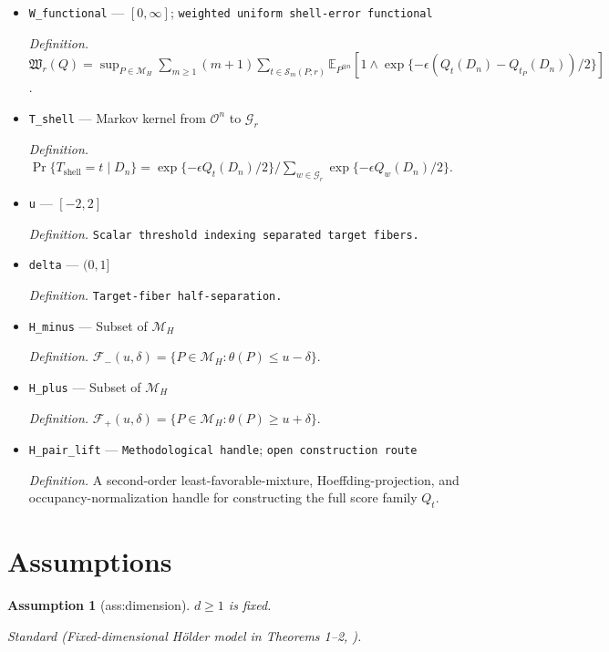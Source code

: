 \documentclass{article}
\newtheorem{assumption}{Assumption}
\begin{document}
\begin{itemize}
  \item \texttt{W\_\allowbreak{}functional} --- \([0,\infty]\); \texttt{weighted uniform shell-\allowbreak{}error functional}
  \par\smallskip\noindent\emph{Definition.} \(\mathfrak W_r(Q)=\sup_{P\in\mathcal M_H}\sum_{m\ge1}(m+1)\sum_{t\in\mathcal S_m(P;r)}\mathbb E_{P^{\otimes n}}[1\wedge\exp\{-\epsilon(Q_t(D_n)-Q_{t_P}(D_n))/2\}]\).
  \item \texttt{T\_\allowbreak{}shell} --- Markov kernel from \(\mathcal O^n\) to \(\mathcal G_r\)
  \par\smallskip\noindent\emph{Definition.} \(\Pr\{T_{\mathrm{shell}}=t\mid D_n\}=\exp\{-\epsilon Q_t(D_n)/2\}/\sum_{w\in\mathcal G_r}\exp\{-\epsilon Q_w(D_n)/2\}\).
  \item \texttt{u} --- \([-2,2]\)
  \par\smallskip\noindent\emph{Definition.} \texttt{Scalar threshold indexing separated target fibers.}
  \item \texttt{delta} --- \((0,1]\)
  \par\smallskip\noindent\emph{Definition.} \texttt{Target-\allowbreak{}fiber half-\allowbreak{}separation.}
  \item \texttt{H\_\allowbreak{}minus} --- Subset of \(\mathcal M_H\)
  \par\smallskip\noindent\emph{Definition.} \(\mathcal F_-(u,\delta)=\{P\in\mathcal M_H:\theta(P)\le u-\delta\}\).
  \item \texttt{H\_\allowbreak{}plus} --- Subset of \(\mathcal M_H\)
  \par\smallskip\noindent\emph{Definition.} \(\mathcal F_+(u,\delta)=\{P\in\mathcal M_H:\theta(P)\ge u+\delta\}\).
  \item \texttt{H\_\allowbreak{}pair\_\allowbreak{}lift} --- \texttt{Methodological handle}; \texttt{open construction route}
  \par\smallskip\noindent\emph{Definition.} A second-order least-favorable-mixture, Hoeffding-projection, and occupancy-normalization handle for constructing the full score family \(Q_t\).
\end{itemize}

\section{Assumptions}

\begin{assumption}[ass:dimension]\label{ass:dimension}
\(d\ge1\) is fixed.
\par\smallskip\noindent\emph{Standard} (Fixed-dimensional Hölder model in Theorems 1--2, \cite{kennedy2024minimax}).
\end{assumption}
\end{document}
